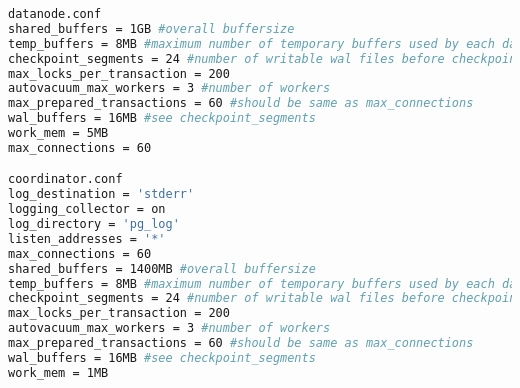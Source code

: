 \begin{lstlisting}[basicstyle=\tiny,language=bash,caption={Konfigurationsdatei pgxc-ctl}]
datanode.conf
shared_buffers = 1GB #overall buffersize
temp_buffers = 8MB #maximum number of temporary buffers used by each database session
checkpoint_segments = 24 #number of writable wal files before checkpoint
max_locks_per_transaction = 200
autovacuum_max_workers = 3 #number of workers
max_prepared_transactions = 60 #should be same as max_connections
wal_buffers = 16MB #see checkpoint_segments
work_mem = 5MB
max_connections = 60

coordinator.conf
log_destination = 'stderr'
logging_collector = on
log_directory = 'pg_log'
listen_addresses = '*'
max_connections = 60
shared_buffers = 1400MB #overall buffersize
temp_buffers = 8MB #maximum number of temporary buffers used by each database session
checkpoint_segments = 24 #number of writable wal files before checkpoint
max_locks_per_transaction = 200
autovacuum_max_workers = 3 #number of workers
max_prepared_transactions = 60 #should be same as max_connections
wal_buffers = 16MB #see checkpoint_segments
work_mem = 1MB
\end{lstlisting} 
 
\newpage